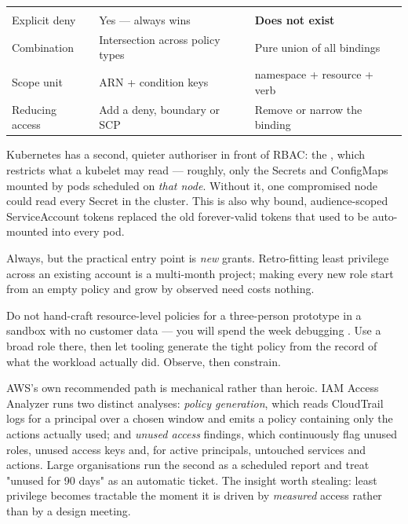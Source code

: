 \begin{center}\small
\wbrowcolors
\begin{tabularx}{\linewidth}{@{}L{27mm} X X@{}}
 &  & \\
Explicit deny & Yes --- always wins & \textbf{Does not exist}\\
Combination & Intersection across policy types & Pure union of all bindings\\
Scope unit & ARN + condition keys & namespace + resource + verb\\
Reducing access & Add a deny, boundary or SCP & Remove or narrow the binding\\
\end{tabularx}
\end{center}

\begin{behind}
Kubernetes has a second, quieter authoriser in front of RBAC: the , which restricts what a kubelet may read --- roughly, only the Secrets and ConfigMaps mounted by pods scheduled on \emph{that node}. Without it, one compromised node could read every Secret in the cluster. This is also why bound, audience-scoped ServiceAccount tokens replaced the old forever-valid tokens that used to be auto-mounted into every pod.
\end{behind}

 Always, but the practical entry point is \emph{new} grants. Retro-fitting least privilege across an existing account is a multi-month project; making every new role start from an empty policy and grow by observed need costs nothing.

 Do not hand-craft resource-level policies for a three-person prototype in a sandbox with no customer data --- you will spend the week debugging . Use a broad role there, then let tooling generate the tight policy from the record of what the workload actually did. Observe, then constrain.

 AWS's own recommended path is mechanical rather than heroic. IAM Access Analyzer runs two distinct analyses: \emph{policy generation}, which reads CloudTrail logs for a principal over a chosen window and emits a policy containing only the actions actually used; and \emph{unused access} findings, which continuously flag unused roles, unused access keys and, for active principals, untouched services and actions. Large organisations run the second as a scheduled report and treat "unused for 90 days" as an automatic ticket. The insight worth stealing: least privilege becomes tractable the moment it is driven by \emph{measured} access rather than by a design meeting.

